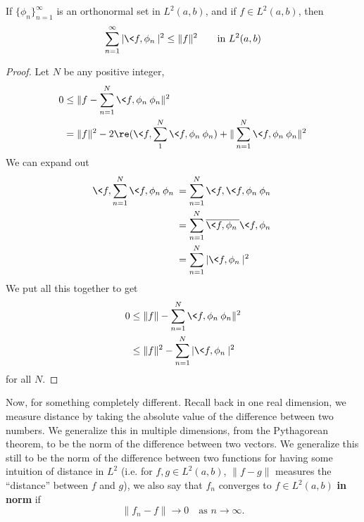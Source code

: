 \begin{bessel}
If $\{\phi_{n}\}^{\infty}_{n=1}$ is an orthonormal set in
$L^{2}(a,b)$, and if $f\in L^{2}(a,b)$, then
\begin{equation}
\sum^{\infty}_{n=1}|\<f,\phi_{n}\>|^{2} \leq
\|f\|^2\qquad\text{in $L^{2}(a,b)$}
\end{equation}
\end{bessel}
\begin{proof}
Let $N$ be any positive integer,
\begin{align*}
0 &\leq \|f - \sum^{N}_{n=1}\<f,\phi_n\>\phi_n\|^2\\
&=\|f\|^2 - 2\re(\<f,\sum^{N}_{1}\<f,\phi_n\>\phi_n) +
\|\sum^{N}_{n=1}\<f,\phi_{n}\>\phi_{n}\|^{2}
\end{align*}
We can expand out
\begin{align*}
\<f,\sum^{N}_{n=1}\<f,\phi_n\>\phi_n\> &= \sum^{N}_{n=1}
\<f,\<f,\phi_n\>\phi_n\>\\
&= \sum^{N}_{n=1}\overline{\<f,\phi_n\>}\<f,\phi_n\>\\
&= \sum^{N}_{n=1}|\<f,\phi_n\>|^{2}
\end{align*}
We put all this together to get
\begin{align*}
0 &\leq \|f\| - \sum^{N}_{n=1}\<f,\phi_n\>\phi_n\|^2\\
&\leq \|f\|^2 - \sum^{N}_{n=1}|\<f,\phi_n\>|^2
\end{align*}
for all $N$.
\end{proof}
Now, for something completely different. Recall back in one
real dimension, we measure distance by taking the absolute
value of the difference between two numbers. We generalize
this in multiple dimensions, from the Pythagorean theorem,
to be the norm of the difference between two vectors. We
generalize this still to be the norm of the difference
between two functions for having some intuition of distance
in $L^{2}$ (i.e. for $f,g\in L^{2}(a,b)$, $\|f-g\|$ measures
the ``distance'' between $f$ and $g$), we also say that
$f_n$ converges to $f\in L^2(a,b)$ \textbf{in norm} if
\begin{equation}
\|f_n - f\|\to 0\quad\text{as }n\to\infty.
\end{equation}
